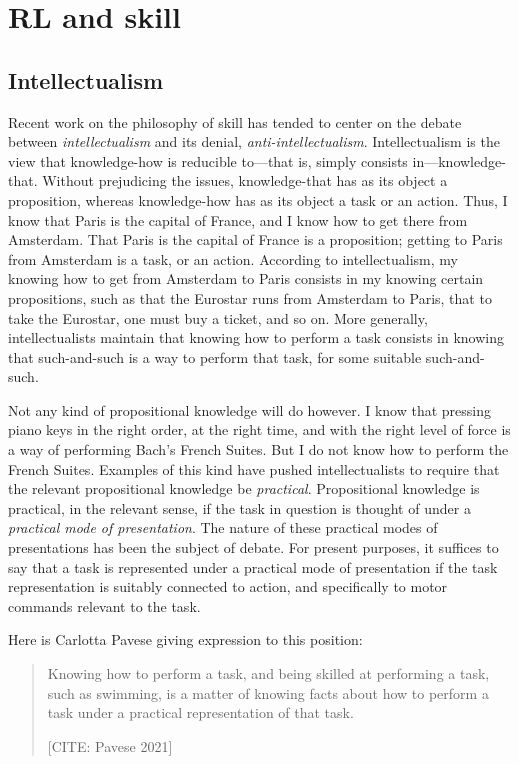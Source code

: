 \section{RL and skill}


\subsection{Intellectualism}

Recent work on the philosophy of skill has tended to center on the debate between \emph{intellectualism} and its denial, \emph{anti-intellectualism}.
Intellectualism is the view that knowledge-how is reducible to---that is, simply consists in---knowledge-that.
Without prejudicing the issues, knowledge-that has as its object a proposition, whereas knowledge-how has as its object a task or an action.
Thus, I know that Paris is the capital of France, and I know how to get there from Amsterdam.
That Paris is the capital of France is a proposition; getting to Paris from Amsterdam is a task, or an action.
According to intellectualism, my knowing how to get from Amsterdam to Paris consists in my knowing certain propositions, such as that the Eurostar runs from Amsterdam to Paris, that to take the Eurostar, one must buy a ticket, and so on.
More generally, intellectualists maintain that knowing how to perform a task consists in knowing that such-and-such is a way to perform that task, for some suitable such-and-such.

Not any kind of propositional knowledge will do however.
I know that pressing piano keys in the right order, at the right time, and with the right level of force is a way of performing Bach's French Suites.
But I do not know how to perform the French Suites.
Examples of this kind have pushed intellectualists to require that the relevant propositional knowledge be \emph{practical}.
Propositional knowledge is practical, in the relevant sense, if the task in question is thought of under a \emph{practical mode of presentation}.
The nature of these practical modes of presentations has been the subject of debate.
For present purposes, it suffices to say that a task is represented under a practical mode of presentation if the task representation is suitably connected to action, and specifically to motor commands relevant to the task.

Here is Carlotta Pavese giving expression to this position:
\begin{quote}
	Knowing how to perform a task, and being skilled at performing a task, such as swimming, is a matter of knowing facts about how to perform a task under a practical representation of that task.

	\hfill [CITE: Pavese 2021]
\end{quote}

